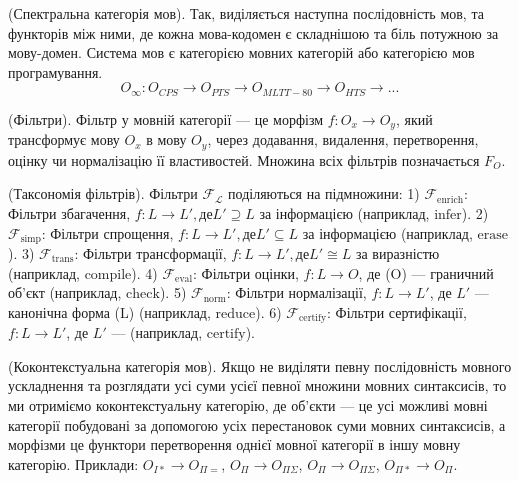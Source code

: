 \begin{definition} (Спектральна категорія мов).
Так, виділяється наступна послідовність мов, та функторів між ними,
де кожна мова-кодомен є складнішою та біль потужною за мову-домен.
Система мов є категорією мовних категорій або категорією мов програмування.
\begin{equation}
O_\infty : O_{CPS} \rightarrow O_{PTS} \rightarrow O_{MLTT-80} \rightarrow O_{HTS} \rightarrow ...
\end{equation}
\end{definition}

\begin{definition} (Фільтри).
Фільтр у мовній категорії --- це морфізм $f: O_x \rightarrow O_y$,
який трансформує мову $O_x$ в мову $O_y$, через додавання,
видалення, перетворення, оцінку чи нормалізацію її властивостей.
Множина всіх фільтрів позначається $F_O$.
\end{definition}

\begin{definition} (Таксономія фільтрів).
Фільтри $\mathcal{F}_\mathcal{L}$ поділяються на підмножини:
1) $\mathcal{F}_{\text{enrich}}$: Фільтри збагачення, $f: L \to L', де L' \supseteq L$ за інформацією (наприклад, $\text{infer}$).
2) $\mathcal{F}_{\text{simp}}$: Фільтри спрощення, $f: L \to L', де L' \subseteq L$ за інформацією (наприклад, $\text{erase}$).
3) $\mathcal{F}_{\text{trans}}$: Фільтри трансформації, $f: L \to L', де L' \cong L$ за виразністю (наприклад, $\text{compile}$).
4) $\mathcal{F}_{\text{eval}}$: Фільтри оцінки, $f: L \to O$, де (O) — граничний об’єкт (наприклад, $\text{check}$).
5) $\mathcal{F}_{\text{norm}}$: Фільтри нормалізації, $f: L \to L'$, де $L'$ — канонічна форма (L) (наприклад, $\text{reduce}$).
6) $\mathcal{F}_{\text{certify}}$: Фільтри сертифікації, $f: L \to L'$, де $L'$ — (наприклад, $\text{certify}$).
\end{definition}

\begin{definition} (Коконтекстуальна категорія мов).
Якщо не виділяти певну послідовність мовного ускладнення та розглядати
усі суми усієї певної множини мовних синтаксисів, то ми отриміємо коконтекстуальну категорію,
де об'єкти --- це усі можливі мовні категорії побудовані за допомогою усіх перестановок суми мовних синтаксисів,
а морфізми це функтори перетворення однієї мовної категорії в іншу мовну категорію.
Приклади: $O_{I*} \rightarrow O_{\Pi=}$, $O_\Pi \rightarrow O_{\Pi\Sigma}$,
          $O_\Pi \rightarrow O_{\Pi\Sigma}$, $O_{\Pi*} \rightarrow O_\Pi$.
\end{definition}

